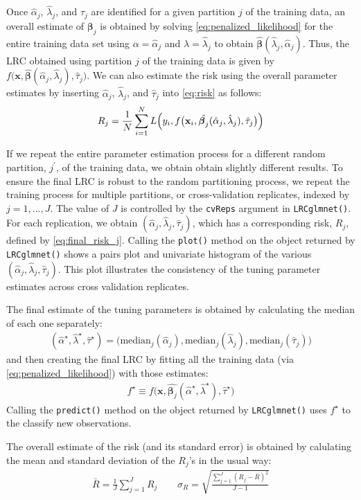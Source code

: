 \documentclass{article}
\begin{document}
Once $\hat\alpha_j$, $\hat\lambda_j$, and $\hat\tau_j$ are identified for a given partition $j$ of the training data, 
an overall estimate of $\boldsymbol\beta_j$ is obtained by
solving \eqref{eq:penalized_likelihood} for the entire training data set using $\alpha = \hat\alpha_j$ and 
$\lambda = \hat\lambda_j$ 
to obtain $\hat{\boldsymbol\beta}(\hat\lambda_j,\hat\alpha_j)$.  Thus, the LRC obtained using partition $j$ of the 
training data is given by $f \bigl( \mathbf{x},\hat{\boldsymbol{\beta}}(\hat\alpha_j,\hat\lambda_j),\hat\tau_j \bigr)$.  We can
also estimate the risk using the overall parameter estimates by inserting $\hat\alpha_j$, $\hat\lambda_j$, and $\hat\tau_j$ 
into
\eqref{eq:risk} as follows:
\begin{align}
\label{eq:final_risk_j}
R_j  = \frac{1}{N}\sum_{i=1}^N L \Bigl(y_i, f\bigl(\mathbf{x}_i,
\hat{\boldsymbol{\beta}_j}(\hat\alpha_j,\hat\lambda_j), \hat\tau_j \bigr) \Bigr)
\end{align}

If we repeat the entire parameter estimation process for a different random partition, $j^\prime$, of the training data, we
obtain obtain slightly different results.  To ensure the final LRC is robust to the random partitioning process, 
we repeat the training process for multiple partitions, or cross-validation replicates, indexed by $j = 1,\ldots,J$.  
The value of $J$ is controlled by the {\tt cvReps} argument in {\tt LRCglmnet()}.  For each replication, we obtain 
$(\hat\alpha_j, \hat\lambda_j, \hat\tau_j)$, which has a corresponding risk, $R_j$, defined by \eqref{eq:final_risk_j}.  
Calling the {\tt plot()} method
on the object returned by {\tt LRCglmnet()} shows a pairs plot and univariate histogram of the
various $(\hat\alpha_j, \hat\lambda_j, \hat\tau_j)$.  This plot illustrates the consistency of the tuning parameter estimates 
across cross validation replicates.

The final estimate of the tuning parameters is obtained by calculating the median of each one separately:
\begin{align}
(\hat\alpha^\star,\hat\lambda^\star,\hat\tau^\star) = \bigl(\text{median}_j(\hat\alpha_j), \text{median}_j(\hat\lambda_j),
  \text{median}_j(\hat\tau_j) \bigr)
\end{align}
\noindent and then creating the final LRC by fitting all the training data (via \eqref{eq:penalized_likelihood})
with those estimates: 
\begin{align}
f^\star \equiv f \bigl(\mathbf{x},\hat{\boldsymbol{\beta}_j}(\hat\alpha^\star,\hat\lambda^\star), \hat\tau^\star \bigr)
\end{align}
\noindent Calling the {\tt predict()} method on the object returned by {\tt LRCglmnet()} uses $f^\star$ to the classify
new observations.

The overall estimate of the risk (and its standard error) is obtained by calulating the mean and standard deviation 
of the $R_j$'s in the usual way:
\begin{align}
\bar{R} = \frac{1}{J}\sum_{j=1}^J R_j & ~~ & \sigma_R = \sqrt{\frac{\sum_{j=1}^J(R_j - \bar{R})^2}{J-1}}
\end{align}
\end{document}
